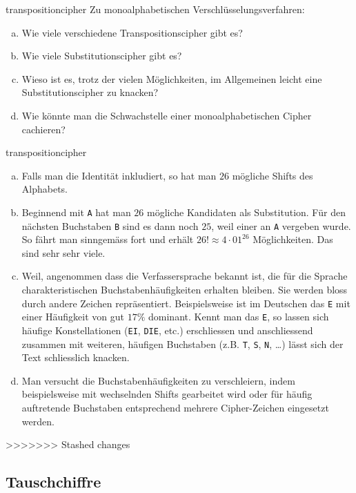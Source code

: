\documentclass[%
<<<<<<< Updated upstream
11pt,%
twoside,%
titlepage,%
german,%
headsepline%
]{scrartcl}
\begin{document}
\begin{uebenv}{transpositioncipher}
    Zu monoalphabetischen Verschlüsselungsverfahren:
    \begin{enumerate}[a)]
        \item Wie viele verschiedene Transpositionscipher gibt es?
        \item Wie viele Substitutionscipher gibt es?
        \item Wieso ist es, trotz der vielen Möglichkeiten, im Allgemeinen leicht eine Substitutionscipher zu knacken?
        \item Wie könnte man die Schwachstelle einer monoalphabetischen Cipher cachieren?
    \end{enumerate}
\end{uebenv}

\begin{lsg}{transpositioncipher}
    \begin{enumerate}[a)]
        \item Falls man die Identität inkludiert, so hat man $26$ mögliche Shifts des Alphabets.
        \item Beginnend mit \texttt{A} hat man $26$ mögliche Kandidaten als Substitution. Für den nächsten Buchstaben \texttt{B} sind es dann noch $25$, weil einer an \texttt{A} vergeben wurde. So fährt man sinngemäss fort und erhält $26!\approx4\cdot01^{26}$ Mög\-lich\-kei\-ten. Das sind sehr sehr viele.
        \item Weil, angenommen dass die Verfassersprache bekannt ist, die für die Sprache charakteristischen Buchstabenhäufigkeiten erhalten bleiben. Sie werden bloss durch andere \glqq Zeichen\grqq{} repräsentiert. Beispielsweise ist im Deutschen das \texttt{E} mit einer Häufigkeit von gut $17\%$ dominant. Kennt man das \texttt{E}, so lassen sich häufige Konstellationen (\texttt{EI}, \texttt{DIE}, etc.) erschliessen und anschliessend zusammen mit weiteren, häufigen Buchstaben (z.B. \texttt{T}, \texttt{S}, \texttt{N}, \dots) lässt sich der Text schliesslich knacken.
        \item Man versucht die Buchstabenhäufigkeiten zu verschleiern, indem beispielsweise mit wechselnden Shifts gearbeitet wird oder für häufig auftretende Buchstaben entsprechend mehrere Cipher-Zeichen eingesetzt werden.
    \end{enumerate}
\end{lsg}
>>>>>>> Stashed changes

\subsection{Tauschchiffre}
\end{document}
